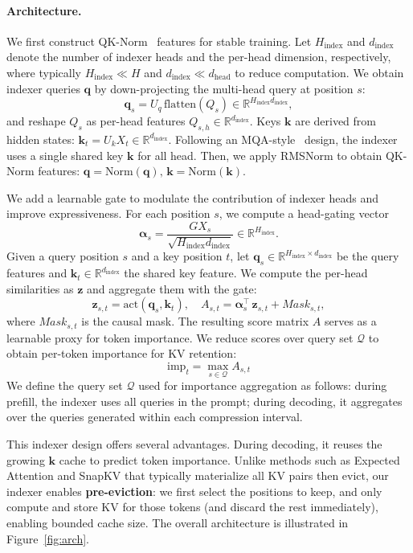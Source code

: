 \paragraph{Architecture.}
We first construct QK-Norm~\citep{henry2020query} features for stable training. Let $H_{\text{index}}$ and $d_{\text{index}}$ denote the number of indexer heads and the per-head dimension, respectively, where typically $H_{\text{index}} \ll H$ and $d_{\text{index}} \ll d_{\text{head}}$ to reduce computation. We obtain indexer queries $\mathbf{q}$ by down-projecting the multi-head query at position $s$:
$$
\mathbf{q}_{s}=U_q\,\mathrm{flatten}(Q_s)\in\mathbb{R}^{H_{\text{index}}d_{\text{index}}},
$$
and reshape $Q_{s}$ as per-head features $Q_{s,h}\in\mathbb{R}^{d_{\text{index}}}$. Keys $\mathbf{k}$ are derived from hidden states: $\mathbf{k}_{t}=U_k X_t\in\mathbb{R}^{d_{\text{index}}}.$ Following an MQA-style~\citep{shazeer2019fast} design, the indexer uses a single shared key $\mathbf{k}$ for all head. Then, we apply RMSNorm to obtain QK-Norm features: $\mathbf{q}=\mathrm{Norm}(\mathbf{q}),\, \mathbf{k}=\mathrm{Norm}(\mathbf{k}).$

We add a learnable gate to modulate the contribution of indexer heads and improve expressiveness. For each position $s$, we compute a head-gating vector
$$
\mathbf{\alpha}_s = \frac{G X_s}{\sqrt{H_{\text{index}}d_{\text{index}}}} \in \mathbb{R}^{H_{\text{index}}}.
$$
Given a query position $s$ and a key position $t$, let $\mathbf{q}_s\in\mathbb{R}^{H_{\text{index}}\times d_{\text{index}}}$ be the query features and $\mathbf{k}_t\in\mathbb{R}^{d_{\text{index}}}$ the shared key feature. We compute the per-head similarities as $\mathbf{z}$ and aggregate them with the gate:
$$
\mathbf{z}_{s,t} = \mathrm{act}\left(\mathbf{q}_s,\mathbf{k}_t\right), \quad A_{s,t} = \mathbf{\alpha}_s^{\top} \, \mathbf{z}_{s,t} + Mask_{s,t},
$$
where $Mask_{s,t}$ is the causal mask. The resulting score matrix $A$ serves as a learnable proxy for token importance. We reduce scores over query set $\mathcal{Q}$ to obtain per-token importance for KV retention:
$$
\mathrm{imp}_{t}=\max_{s\in\mathcal{Q}} A_{s,t}
$$
We define the query set $\mathcal{Q}$ used for importance aggregation as follows: during prefill, the indexer uses all queries in the prompt; during decoding, it aggregates over the queries generated within each compression interval.


This indexer design offers several advantages. During decoding, it reuses the growing $\mathbf{k}$ cache to predict token importance. Unlike methods such as Expected Attention and SnapKV that typically materialize all KV pairs then evict, our indexer enables \textbf{pre-eviction}: we first select the positions to keep, and only compute and store KV for those tokens (and discard the rest immediately), enabling bounded cache size. The overall architecture is illustrated in Figure~\ref{fig:arch}.



